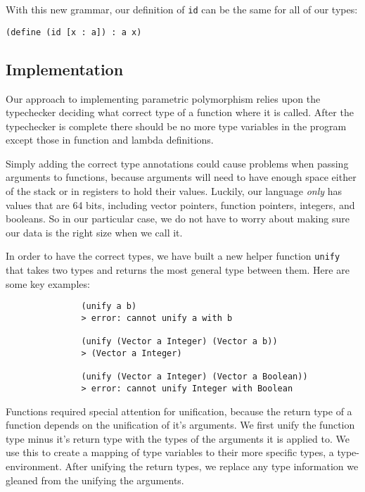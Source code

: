\documentclass{article}
\begin{document}
\noindent
With this new grammar, our definition of {\tt id} can be the same for all of our
types:
\begin{center}
  {\tt (define (id [x : a]) : a x)}
\end{center}

\subsection*{Implementation}
Our approach to implementing parametric polymorphism relies upon the typechecker
deciding what correct type of a function where it is called. After the
typechecker is complete there should be no more type variables in the program
except those in function and lambda definitions.

Simply adding the correct type annotations could cause problems when passing
arguments to functions, because arguments will need to have enough space either
of the stack or in registers to hold their values. Luckily, our language
{\it only} has values that are 64 bits, including vector pointers, function
pointers, integers, and booleans. So in our particular case, we do not have to
worry about making sure our data is the right size when we call it.

In order to have the correct types, we have built a new helper function
{\tt unify} that takes two types and returns the most general type between them.
Here are some key examples:
\begin{verbatim}
               (unify a b)
               > error: cannot unify a with b

               (unify (Vector a Integer) (Vector a b))
               > (Vector a Integer)

               (unify (Vector a Integer) (Vector a Boolean))
               > error: cannot unify Integer with Boolean
\end{verbatim}

Functions required special attention for unification, because the return type
of a function depends on the unification of it's arguments. We first unify the
function type minus it's return type with the types of the arguments it is
applied to. We use this to create a mapping of type variables to their more
specific types, a type-environment. After unifying the return types, we replace
any type information we gleaned from the unifying the arguments.
\end{document}
